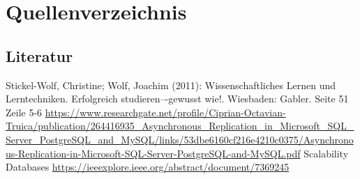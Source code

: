
  
   \newpage
    \thispagestyle{empty}
   \section{Quellenverzeichnis}
     \subsection{Literatur}
     \renewcommand{\refname}{} %
     \begin{thebibliography}{SW11} %
        Stickel-Wolf, Christine; Wolf, Joachim (2011): Wissenschaftliches Lernen und Lerntechniken. Erfolgreich studieren–-gewusst wie!. Wiesbaden: Gabler. 
        Seite 51 Zeile 5-6 \url{https://www.researchgate.net/profile/Ciprian-Octavian-Truica/publication/264416935_Asynchronous_Replication_in_Microsoft_SQL_Server_PostgreSQL_and_MySQL/links/53dbe6160cf216e4210c0375/Asynchronous-Replication-in-Microsoft-SQL-Server-PostgreSQL-and-MySQL.pdf}
        Scalability Databases \url{https://ieeexplore.ieee.org/abstract/document/7369245}
      \end{thebibliography}
          
